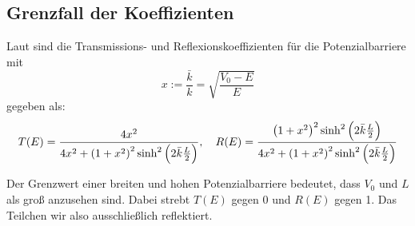 \subsection{Grenzfall der Koeffizienten}

Laut \cite[Seite 283]{nolting-theo5} sind die Transmissions- und
Reflexionskoeffizienten für die Potenzialbarriere mit
\[
	x := \frac{\bar k}{k} = \sqrt{\frac{V_0-E}E}
\]
gegeben als:
\[
	T(E) = \frac{4x^2}{4x^2 + \del{1+x^2}^2 \sinh^2\del{2 \bar k \frac L2}}
	\eqnsep
	R(E) = \frac{\del{1+x^2}^2 \sinh^2\del{2 \bar k \frac L2}}
	{4x^2 + \del{1+x^2}^2 \sinh^2\del{2 \bar k \frac L2}}
\]

Der Grenzwert einer breiten und hohen Potenzialbarriere bedeutet, dass $V_0$
und $L$ als groß anzusehen sind. Dabei strebt $T(E)$ gegen $0$ und $R(E)$ gegen
1. Das Teilchen wir also ausschließlich reflektiert.


\IfFileExists{\bibliographyfile}{
	
}{}



